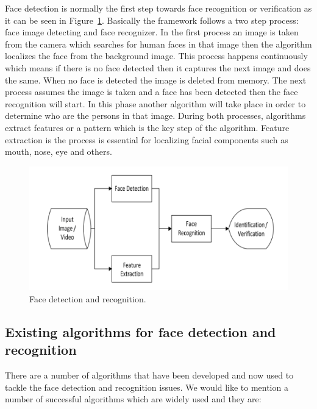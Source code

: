 Face detection is normally the first step towards face recognition or verification as it can be seen in  Figure~\ref{fig:framework}. Basically the framework follows a two step process: face image detecting and face recognizer. In the first process an image is taken from the camera which searches for human faces in that image then the algorithm localizes the face from the background image. This process happens continuously which means if there is no face detected then it captures the next image and does the same. When no face is detected the image is deleted from memory. The next process assumes the image is taken and a face has been detected then the face recognition will start. In this phase another algorithm will take place in order to determine who are the persons in that image. During both processes, algorithms extract features or a pattern which is the key step of the algorithm. Feature extraction is the process is essential for localizing facial components such as mouth, nose, eye and others. 

\begin{figure}[!htb]
    \centering
    \includegraphics[width=1\textwidth]{figures/framework.jpg}
    \caption{ Face detection and recognition.}
    \label{fig:framework}
\end{figure}


\subsection{Existing  algorithms  for  face detection and recognition}

There are a number of algorithms that have been developed and now used to tackle the face detection and recognition issues. We would like to mention a number of successful algorithms which are widely used and they are: 

